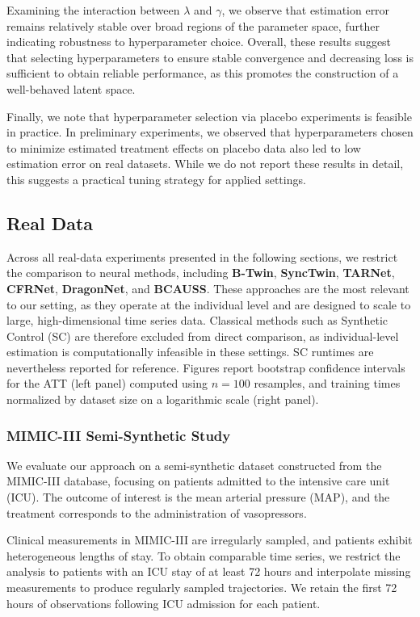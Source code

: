 \documentclass[10pt]{article} %
\begin{document}
Examining the interaction between \( \lambda \) and \( \gamma \), we observe that estimation error remains relatively stable over broad regions of the parameter space, further indicating robustness to hyperparameter choice. Overall, these results suggest that selecting hyperparameters to ensure stable convergence and decreasing loss is sufficient to obtain reliable performance, as this promotes the construction of a well-behaved latent space.

Finally, we note that hyperparameter selection via placebo experiments is feasible in practice. In preliminary experiments, we observed that hyperparameters chosen to minimize estimated treatment effects on placebo data also led to low estimation error on real datasets. While we do not report these results in detail, this suggests a practical tuning strategy for applied settings.
\subsection{Real Data}
Across all real-data experiments presented in the following sections, we restrict the comparison to neural methods, including \textbf{B-Twin}, \textbf{SyncTwin}, \textbf{TARNet}, \textbf{CFRNet}, \textbf{DragonNet}, and \textbf{BCAUSS}. These approaches are the most relevant to our setting, as they operate at the individual level and are designed to scale to large, high-dimensional time series data. Classical methods such as Synthetic Control (SC) are therefore excluded from direct comparison, as individual-level estimation is computationally infeasible in these settings. SC runtimes are nevertheless reported for reference.
Figures report bootstrap confidence intervals for the ATT (left panel)  computed using $n = 100$ resamples,  and training times normalized by dataset size on a logarithmic scale (right panel). 
\subsubsection{MIMIC-III Semi-Synthetic Study}

We evaluate our approach on a semi-synthetic dataset constructed from the MIMIC-III \citep{johnson2016mimic} database, focusing on patients admitted to the intensive care unit (ICU). The outcome of interest is the mean arterial pressure (MAP), and the treatment corresponds to the administration of vasopressors.

Clinical measurements in MIMIC-III are irregularly sampled, and patients exhibit heterogeneous lengths of stay. To obtain comparable time series, we restrict the analysis to patients with an ICU stay of at least 72 hours and interpolate missing measurements to produce regularly sampled trajectories. We retain the first 72 hours of observations following ICU admission for each patient.
\end{document}
